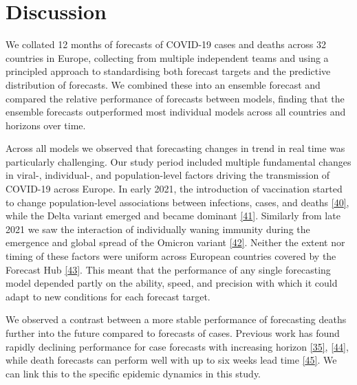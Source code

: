\documentclass[
]{article}
\begin{document}
\hypertarget{discussion}{%
\section{Discussion}\label{discussion}}

We collated 12 months of forecasts of COVID-19 cases and deaths across 32 countries in Europe, collecting from multiple independent teams and using a principled approach to standardising both forecast targets and the predictive distribution of forecasts. We combined these into an ensemble forecast and compared the relative performance of forecasts between models, finding that the ensemble forecasts outperformed most individual models across all countries and horizons over time.

Across all models we observed that forecasting changes in trend in real time was particularly challenging. Our study period included multiple fundamental changes in viral-, individual-, and population-level factors driving the transmission of COVID-19 across Europe. In early 2021, the introduction of vaccination started to change population-level associations between infections, cases, and deaths \protect\hyperlink{ref-europeancentrefordiseasepreventionandcontrolInterimGuidanceBenefits2021}{{[}40{]}}, while the Delta variant emerged and became dominant \protect\hyperlink{ref-europeancentrefordiseasepreventionandcontrolThreatAssessmentBrief2021}{{[}41{]}}. Similarly from late 2021 we saw the interaction of individually waning immunity during the emergence and global spread of the Omicron variant \protect\hyperlink{ref-europeancentrefordiseasepreventionandcontrolAssessmentFurtherSpread2022}{{[}42{]}}. Neither the extent nor timing of these factors were uniform across European countries covered by the Forecast Hub \protect\hyperlink{ref-europeancentrefordiseasepreventionandcontrolOverviewImplementationCOVID192021}{{[}43{]}}. This meant that the performance of any single forecasting model depended partly on the ability, speed, and precision with which it could adapt to new conditions for each forecast target.

We observed a contrast between a more stable performance of forecasting deaths further into the future compared to forecasts of cases. Previous work has found rapidly declining performance for case forecasts with increasing horizon \protect\hyperlink{ref-cramerEvaluationIndividualEnsemble2021}{{[}35{]}}, \protect\hyperlink{ref-castroTurningPointEnd2020}{{[}44{]}}, while death forecasts can perform well with up to six weeks lead time \protect\hyperlink{ref-friedmanPredictivePerformanceInternational2021}{{[}45{]}}. We can link this to the specific epidemic dynamics in this study.
\end{document}
